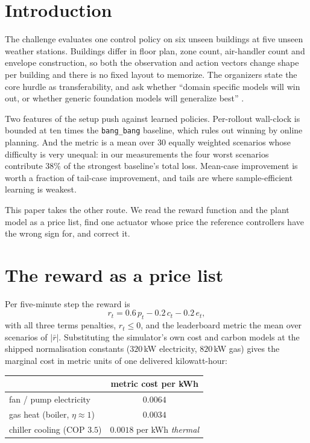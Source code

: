 \documentclass[10pt]{article}
\begin{document}
\section{Introduction}

The challenge \cite{goldfeder2026} evaluates one control policy on six unseen
buildings at five unseen weather stations. Buildings differ in floor plan, zone
count, air-handler count and envelope construction, so both the observation and
action vectors change shape per building and there is no fixed layout to
memorize. The organizers state the core hurdle as transferability, and ask
whether ``domain specific models will win out, or whether generic foundation
models will generalize best'' \cite{goldfeder2026}.

Two features of the setup push against learned policies. Per-rollout wall-clock
is bounded at ten times the \texttt{bang\_bang} baseline, which rules out
winning by online planning. And the metric is a mean over 30 equally weighted
scenarios whose difficulty is very unequal: in our measurements the four worst
scenarios contribute $38\%$ of the strongest baseline's total loss. Mean-case
improvement is worth a fraction of tail-case improvement, and tails are where
sample-efficient learning is weakest.

This paper takes the other route. We read the reward function and the plant
model as a price list, find one actuator whose price the reference controllers
have the wrong sign for, and correct it.

\section{The reward as a price list}

Per five-minute step the reward is
\begin{equation}
r_t = 0.6\,p_t - 0.2\,c_t - 0.2\,e_t ,
\end{equation}
with all three terms penalties, $r_t \le 0$, and the leaderboard metric the mean
over scenarios of $|\bar r|$. Substituting the simulator's own cost and carbon
models at the shipped normalisation constants
($320$\,kW electricity, $820$\,kW gas) gives the marginal cost in metric units
of one delivered kilowatt-hour:

\begin{center}
\begin{tabular}{lc}
\toprule
 & metric cost per kWh \\
\midrule
fan / pump electricity            & $0.0064$ \\
gas heat (boiler, $\eta\approx1$) & $0.0034$ \\
chiller cooling (COP $3.5$)       & $0.0018$ per kWh \emph{thermal} \\
\bottomrule
\end{tabular}
\end{center}
\end{document}
